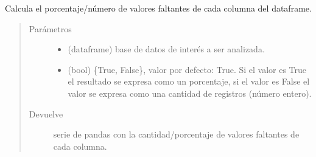 \documentclass[letterpaper,10pt,openany,spanish]{sphinxmanual}
\begin{document}

\begin{fulllineitems}
\label{\detokenize{datos:datos.faltantes}}
Calcula el porcentaje/número de valores faltantes de cada columna del dataframe.
\begin{quote}\begin{description}
\item[{Parámetros}] \leavevmode\begin{itemize}
\item {} 
 \textendash{} (dataframe) base de datos de interés a ser analizada.

\item {} 
 \textendash{} (bool) \{True, False\}, valor por defecto: True. Si el valor es True el resultado se expresa como un porcentaje, si el valor es False el valor se expresa como una cantidad de registros (número entero).

\end{itemize}

\item[{Devuelve}] \leavevmode
serie de pandas con la cantidad/porcentaje de valores faltantes de cada columna.

\end{description}\end{quote}

\end{fulllineitems}

\end{document}
